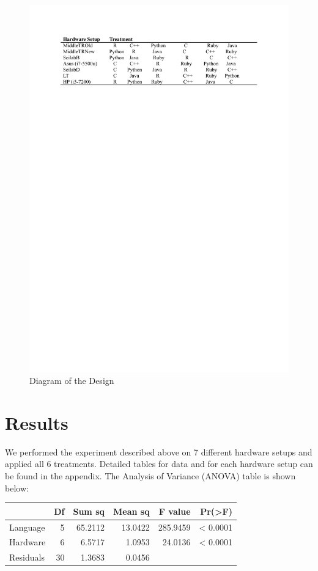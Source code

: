 \documentclass[12pt,halfline,a4paper,]{ouparticle}
\begin{document}
\begin{figure}[H]
\includegraphics[width=1\linewidth]{diagram} \caption{Diagram of the Design}\label{fig:unnamed-chunk-1}
\end{figure}
\newpage

\section{Results}\label{results}

We performed the experiment described above on 7 different hardware
setups and applied all 6 treatments. Detailed tables for data and for
each hardware setup can be found in the appendix. The Analysis of
Variance (ANOVA) table is shown below:

\begin{longtable}[]{@{}lrrrrr@{}}
\toprule\noalign{}
& Df & Sum sq & Mean sq & F value & Pr(\textgreater F) \\
\midrule\noalign{}
\endhead
\bottomrule\noalign{}
\endlastfoot
Language & 5 & 65.2112 & 13.0422 & 285.9459 & \textless{} 0.0001 \\
Hardware & 6 & 6.5717 & 1.0953 & 24.0136 & \textless{} 0.0001 \\
Residuals & 30 & 1.3683 & 0.0456 & & \\
\end{longtable}
\end{document}
